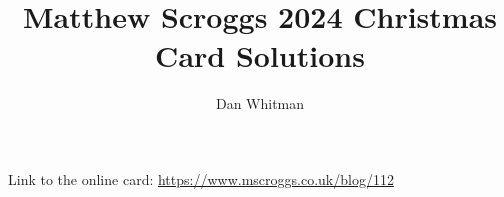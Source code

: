 \documentclass{article}
\begin{document}
\title{Matthew Scroggs 2024 Christmas Card Solutions}
\author{Dan Whitman}
\date{}

\maketitle

Link to the online card: \href{https://www.mscroggs.co.uk/blog/112}{https://www.mscroggs.co.uk/blog/112}










\end{document}
